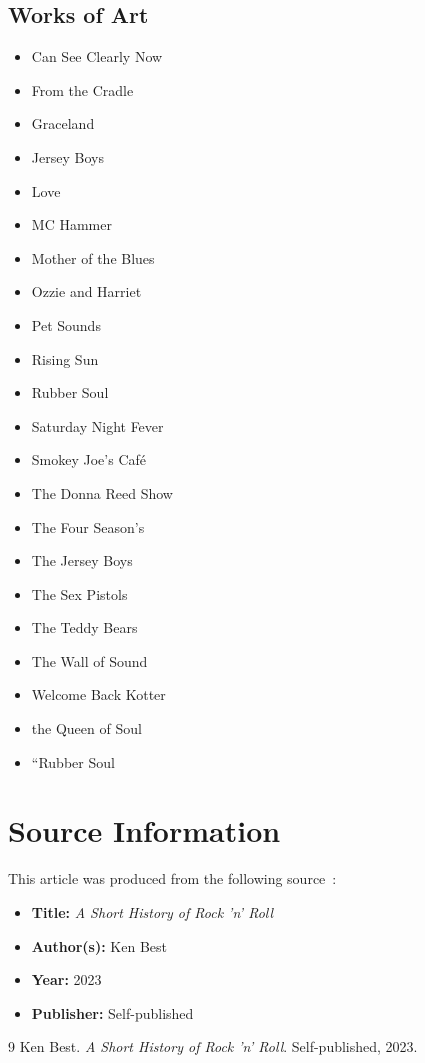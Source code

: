 \documentclass[12pt,a4paper]{article}
\begin{document}
\subsection{Works of Art}
\begin{itemize}
  \item Can See Clearly Now
  \item From the Cradle
  \item Graceland
  \item Jersey Boys
  \item Love
  \item MC Hammer
  \item Mother of the Blues
  \item Ozzie and Harriet
  \item Pet Sounds
  \item Rising Sun
  \item Rubber Soul
  \item Saturday Night Fever
  \item Smokey Joe's Caf\'e
  \item The Donna Reed Show
  \item The Four Season's
  \item The Jersey Boys
  \item The Sex Pistols
  \item The Teddy Bears
  \item The Wall of Sound
  \item Welcome Back Kotter
  \item the Queen of Soul
  \item ``Rubber Soul
\end{itemize}


\section{Source Information}

This article was produced from the following
source~\cite{best2023}:

\begin{itemize}
  \item \textbf{Title:} \textit{A Short History of Rock 'n' Roll}
  \item \textbf{Author(s):} Ken Best
  \item \textbf{Year:} 2023
  \item \textbf{Publisher:} Self-published
\end{itemize}

\begin{thebibliography}{9}
Ken Best.
\textit{A Short History of Rock 'n' Roll}.
Self-published, 2023.
\end{thebibliography}
\end{document}
